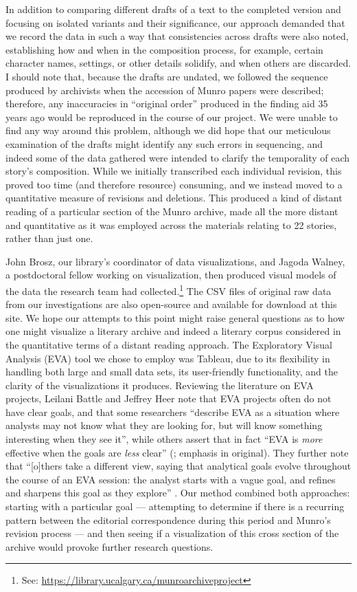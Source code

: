 \documentclass{article}
\begin{document}
In addition to comparing different drafts of a text to the completed
version and focusing on isolated variants and their significance, our
approach demanded that we record the data in such a way that
consistencies across drafts were also noted, establishing how and when
in the composition process, for example, certain character names,
settings, or other details solidify, and when others are discarded. I
should note that, because the drafts are undated, we followed the
sequence produced by archivists when the accession of Munro papers were
described; therefore, any inaccuracies in ``original order'' produced in
the finding aid 35 years ago would be reproduced in the course of our
project. We were unable to find any way around this problem, although we
did hope that our meticulous examination of the drafts might identify
any such errors in sequencing, and indeed some of the data gathered were
intended to clarify the temporality of each story's composition. While
we initially transcribed each individual revision, this proved too time
(and therefore resource) consuming, and we instead moved to a
quantitative measure of revisions and deletions. This produced a kind of
distant reading of a particular section of the Munro archive, made all
the more distant and quantitative as it was employed across the
materials relating to 22 stories, rather than just one.

John Brosz, our library's coordinator of data visualizations, and Jagoda
Walney, a postdoctoral fellow working on visualization, then produced
visual models of the data the research team had collected.\footnote{See: \url{https://library.ucalgary.ca/munroarchiveproject}} 
The CSV files of original raw data from our investigations are also
open-source and available for download at this site. We hope our
attempts to this point might raise general questions as to how one might
visualize a literary archive and indeed a literary corpus considered in
the quantitative terms of a distant reading approach. The Exploratory
Visual Analysis (EVA) tool we chose to employ was Tableau, due to its
flexibility in handling both large and small data sets, its
user-friendly functionality, and the clarity of the visualizations it
produces. Reviewing the literature on EVA projects, Leilani Battle and
Jeffrey Heer note that EVA projects often do not have clear goals, and
that some researchers ``describe EVA as a situation where analysts may
not know what they are looking for, but will know something interesting
when they see it'', while others assert that in fact ``EVA is
\emph{more} effective when the goals are \emph{less} clear'' (\cite[147]{battle_characterizing_2019};
emphasis in original). They further note that ``{[}o{]}thers take a
different view, saying that analytical goals evolve throughout the
course of an EVA session: the analyst starts with a vague goal, and
refines and sharpens this goal as they explore'' \citep[147]{battle_characterizing_2019}. Our method
combined both approaches: starting with a particular goal –– attempting
to determine if there is a recurring pattern between the editorial
correspondence during this period and Munro's revision process –– and
then seeing if a visualization of this cross section of the archive
would provoke further research questions.
\end{document}
